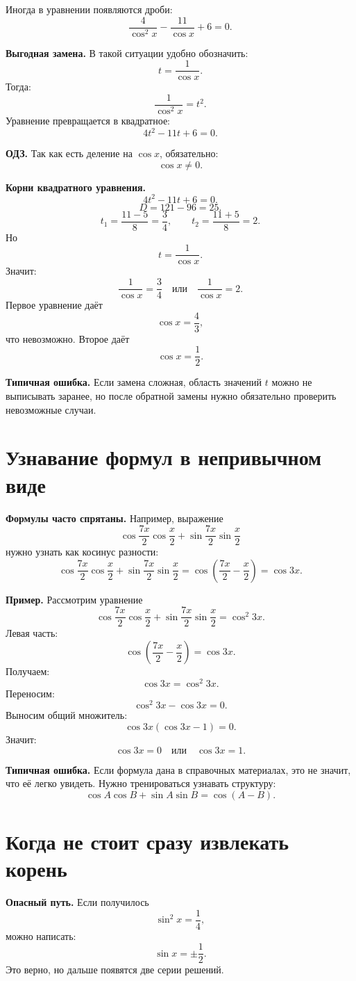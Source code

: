 \documentclass[a4paper,12pt]{article}
\newcommand{\sectionline}{\vspace{1mm}{\color{accent}\hrule height 0.6pt}\vspace{2mm}}
\newcommand{\important}[1]{\textcolor{darkaccent}{\textbf{#1}}}
\newcommand{\warning}[1]{\textcolor{warn}{\textbf{#1}}}
\begin{document}
Иногда в уравнении появляются дроби:
\[
\frac{4}{\cos^2x}-\frac{11}{\cos x}+6=0.
\]

\important{Выгодная замена.}
В такой ситуации удобно обозначить:
\[
t=\frac1{\cos x}.
\]
Тогда:
\[
\frac{1}{\cos^2x}=t^2.
\]
Уравнение превращается в квадратное:
\[
4t^2-11t+6=0.
\]

\important{ОДЗ.}
Так как есть деление на \(\cos x\), обязательно:
\[
\cos x\ne0.
\]

\important{Корни квадратного уравнения.}
\[
4t^2-11t+6=0.
\]
\[
D=121-96=25.
\]
\[
t_1=\frac{11-5}{8}=\frac34,
\qquad
t_2=\frac{11+5}{8}=2.
\]
Но
\[
t=\frac1{\cos x}.
\]
Значит:
\[
\frac1{\cos x}=\frac34
\quad\text{или}\quad
\frac1{\cos x}=2.
\]
Первое уравнение даёт
\[
\cos x=\frac43,
\]
что невозможно. Второе даёт
\[
\cos x=\frac12.
\]

\warning{Типичная ошибка.}
Если замена сложная, область значений \(t\) можно не выписывать заранее, но после обратной замены нужно обязательно проверить невозможные случаи.

\section{Узнавание формул в непривычном виде}
\sectionline

\important{Формулы часто спрятаны.}
Например, выражение
\[
\cos\frac{7x}{2}\cos\frac{x}{2}+\sin\frac{7x}{2}\sin\frac{x}{2}
\]
нужно узнать как косинус разности:
\[
\cos\frac{7x}{2}\cos\frac{x}{2}+\sin\frac{7x}{2}\sin\frac{x}{2}
=
\cos\left(\frac{7x}{2}-\frac{x}{2}\right)
=
\cos 3x.
\]

\important{Пример.}
Рассмотрим уравнение
\[
\cos\frac{7x}{2}\cos\frac{x}{2}+\sin\frac{7x}{2}\sin\frac{x}{2}
=
\cos^2 3x.
\]
Левая часть:
\[
\cos\left(\frac{7x}{2}-\frac{x}{2}\right)=\cos3x.
\]
Получаем:
\[
\cos3x=\cos^2 3x.
\]
Переносим:
\[
\cos^2 3x-\cos3x=0.
\]
Выносим общий множитель:
\[
\cos3x(\cos3x-1)=0.
\]
Значит:
\[
\cos3x=0
\quad\text{или}\quad
\cos3x=1.
\]

\warning{Типичная ошибка.}
Если формула дана в справочных материалах, это не значит, что её легко увидеть. Нужно тренироваться узнавать структуру:
\[
\cos A\cos B+\sin A\sin B=\cos(A-B).
\]

\section{Когда не стоит сразу извлекать корень}
\sectionline

\important{Опасный путь.}
Если получилось
\[
\sin^2x=\frac14,
\]
можно написать:
\[
\sin x=\pm\frac12.
\]
Это верно, но дальше появятся две серии решений.
\end{document}
